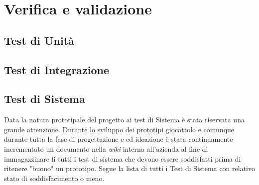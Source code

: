 
\chapter{Verifica e validazione}
\label{cap:verifica-validazione}

\section{Test di Unità}

\section{Test di Integrazione}

\section{Test di Sistema}
Data la natura prototipale del progetto ai test di Sistema è stata riservata una grande attenzione. Durante lo sviluppo dei prototipi giocattolo e comunque durante tutta la fase di progettazione e ed ideazione è stata continuamente incrementato un documento nella \emph{wiki} interna all'azienda al fine di immagazzinare li tutti i test di sistema che devono essere soddisfatti prima di ritenere "buono" un prototipo.
Segue la lista di tutti i Test di Sistema con relativo stato di soddisfacimento o meno.
